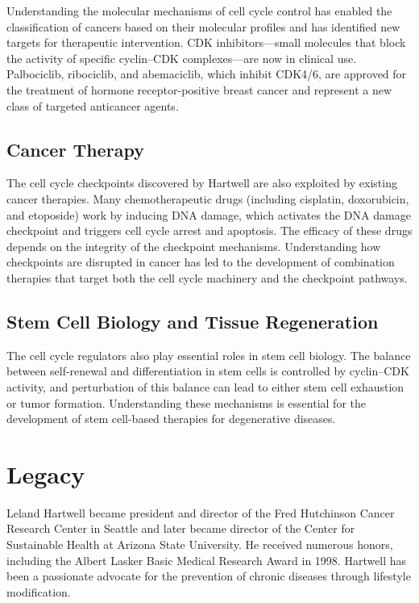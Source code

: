 Understanding the molecular mechanisms of cell cycle control has enabled the classification of cancers based on their molecular profiles and has identified new targets for therapeutic intervention. CDK inhibitors---small molecules that block the activity of specific cyclin--CDK complexes---are now in clinical use. Palbociclib, ribociclib, and abemaciclib, which inhibit CDK4/6, are approved for the treatment of hormone receptor-positive breast cancer and represent a new class of targeted anticancer agents.

\subsection{Cancer Therapy}

The cell cycle checkpoints discovered by Hartwell are also exploited by existing cancer therapies. Many chemotherapeutic drugs (including cisplatin, doxorubicin, and etoposide) work by inducing DNA damage, which activates the DNA damage checkpoint and triggers cell cycle arrest and apoptosis. The efficacy of these drugs depends on the integrity of the checkpoint mechanisms. Understanding how checkpoints are disrupted in cancer has led to the development of combination therapies that target both the cell cycle machinery and the checkpoint pathways.

\subsection{Stem Cell Biology and Tissue Regeneration}

The cell cycle regulators also play essential roles in stem cell biology. The balance between self-renewal and differentiation in stem cells is controlled by cyclin--CDK activity, and perturbation of this balance can lead to either stem cell exhaustion or tumor formation. Understanding these mechanisms is essential for the development of stem cell-based therapies for degenerative diseases.

\section{Legacy}

Leland Hartwell became president and director of the Fred Hutchinson Cancer Research Center in Seattle and later became director of the Center for Sustainable Health at Arizona State University. He received numerous honors, including the Albert Lasker Basic Medical Research Award in 1998. Hartwell has been a passionate advocate for the prevention of chronic diseases through lifestyle modification.

